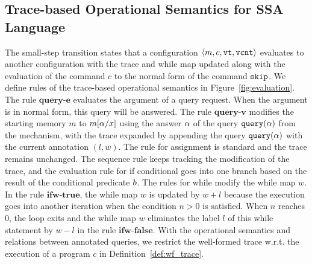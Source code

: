 \subsection{Trace-based Operational Semantics for SSA Language}
{
%
%
The small-step transition states that a configuration $\langle m,c, \mathtt{vt}, \mathtt{vcnt} \rangle$ evaluates to another configuration with the trace and while map updated along with the evaluation of the command $c$ to the normal form of the command $\mathtt{skip}$.  
We define rules of the trace-based operational semantics in Figure~\ref{fig:evaluation}.
%
%
The rule $\textbf{query-e}$ evaluates the argument of a query request. When the argument is in normal form, this query will be answered.
%
The rule $\textbf{query-v}$ modifies the starting memory $m$ to $m[\alpha/x]$ using the answer $\alpha$ of the query ${\tt query}(\alpha)$ from the mechanism, 
with the trace expanded by appending the query ${\tt query}(\alpha)$ with the current annotation $(l,w)$. 
%
The rule for assignment is standard and the trace remains unchanged.%
The sequence rule keeps tracking the modification of the trace, and the evaluation rule for if conditional goes into one branch based on the result of the conditional predicate $b$. 
%
The rules for while modify the while map $w$. 
In the rule $\textbf{ifw-true}$, the while map $w$ is updated by $w + l$ because the execution goes into another iteration when the condition $n >0$ is satisfied. 
%
When $n$ reaches $0$, the loop exits and the while map $w$ eliminates the label $l$ of this while statement by $w - l$ in the rule $\textbf{ifw-false}$.  
With the operational semantics and relations between annotated queries, we restrict the well-formed trace w.r.t. the execution of a program $c$ in Definition~\ref{def:wf_trace}.
%
%
%
%
\begin{figure}
\end{figure}}
